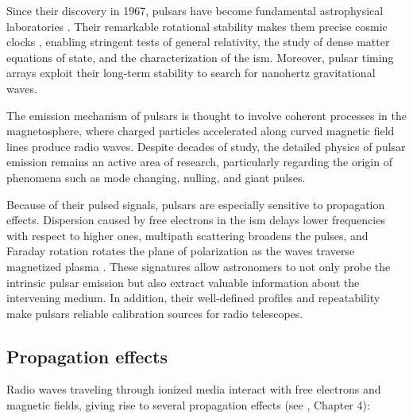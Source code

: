 Since their discovery in 1967, pulsars have become fundamental astrophysical laboratories \citep{Lorimer2004}. Their remarkable rotational stability makes them precise cosmic clocks \citep{PulsarTimingArray}, enabling stringent tests of general relativity, the study of dense matter equations of state, and the characterization of the \gls{ism}. Moreover, pulsar timing arrays exploit their long-term stability to search for nanohertz gravitational waves.

The emission mechanism of pulsars is thought to involve coherent processes in the magnetosphere, where charged particles accelerated along curved magnetic field lines produce radio waves. Despite decades of study, the detailed physics of pulsar emission remains an active area of research, particularly regarding the origin of phenomena such as mode changing, nulling, and giant pulses.

Because of their pulsed signals, pulsars are especially sensitive to propagation effects. Dispersion caused by free electrons in the \gls{ism} delays lower frequencies with respect to higher ones, multipath scattering broadens the pulses, and Faraday rotation rotates the plane of polarization as the waves traverse magnetized plasma \citep{PropagationISM}. These signatures allow astronomers to not only probe the intrinsic pulsar emission but also extract valuable information about the intervening medium. In addition, their well-defined profiles and repeatability make pulsars reliable calibration sources for radio telescopes.

\subsection{Propagation effects}

Radio waves traveling through ionized media interact with free electrons and magnetic fields, giving rise to several propagation effects (see \citealt{Lorimer2004}, Chapter 4):

